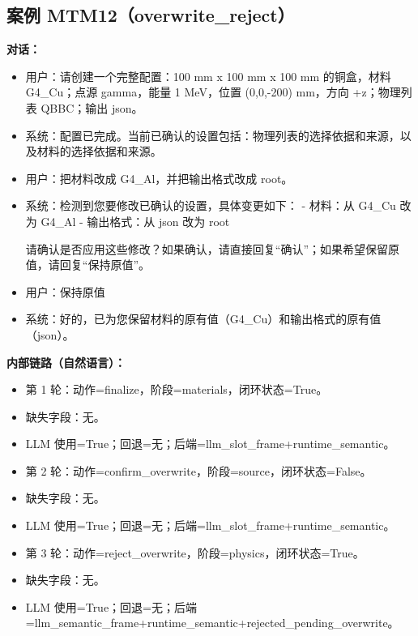 \documentclass[11pt]{ctexart}
\begin{document}
\subsection{案例 MTM12（overwrite\_reject）}
\textbf{对话：}
\begin{itemize}
\item 用户：请创建一个完整配置：100 mm x 100 mm x 100 mm 的铜盒，材料 G4\_Cu；点源 gamma，能量 1 MeV，位置 (0,0,-200) mm，方向 +z；物理列表 QBBC；输出 json。
\item 系统：配置已完成。当前已确认的设置包括：物理列表的选择依据和来源，以及材料的选择依据和来源。
\item 用户：把材料改成 G4\_Al，并把输出格式改成 root。
\item 系统：检测到您要修改已确认的设置，具体变更如下：
- 材料：从 G4\_Cu 改为 G4\_Al
- 输出格式：从 json 改为 root

请确认是否应用这些修改？如果确认，请直接回复“确认”；如果希望保留原值，请回复“保持原值”。
\item 用户：保持原值
\item 系统：好的，已为您保留材料的原有值（G4\_Cu）和输出格式的原有值（json）。
\end{itemize}
\textbf{内部链路（自然语言）：}
\begin{itemize}
\item 第 1 轮：动作=finalize，阶段=materials，闭环状态=True。
\item 缺失字段：无。
\item LLM 使用=True；回退=无；后端=llm\_slot\_frame+runtime\_semantic。
\item 第 2 轮：动作=confirm\_overwrite，阶段=source，闭环状态=False。
\item 缺失字段：无。
\item LLM 使用=True；回退=无；后端=llm\_slot\_frame+runtime\_semantic。
\item 第 3 轮：动作=reject\_overwrite，阶段=physics，闭环状态=True。
\item 缺失字段：无。
\item LLM 使用=True；回退=无；后端=llm\_semantic\_frame+runtime\_semantic+rejected\_pending\_overwrite。
\end{itemize}
\end{document}
